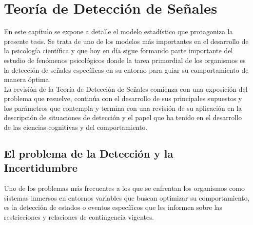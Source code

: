 
\chapter{Teoría de Detección de Señales} %

\label{Cap_SDT} %


\newcommand{\keyword}[1]{\textbf{#1}}
\newcommand{\tabhead}[1]{\textbf{#1}}
\newcommand{\code}[1]{\texttt{#1}}
\newcommand{\file}[1]{\texttt{\bfseries#1}}
\newcommand{\option}[1]{\texttt{\itshape#1}}


En este capítulo se expone a detalle el modelo estadístico que protagoniza la presente tesis. Se trata de uno de los modelos más importantes en el desarrollo de la psicología científica y que hoy en día sigue formando parte importante del estudio de fenómenos psicológicos donde la tarea primordial de los organismos es la detección de señales específicas en su entorno para guiar su comportamiento de manera óptima.\\

La revisión de la Teoría de Detección de Señales comienza con una exposición del problema que resuelve, continúa con el desarrollo de sus principales supuestos y los parámetros que contempla y termina con una revisión de su aplicación en la descripción de situaciones de detección y el papel que ha tenido en el desarrollo de las ciencias cognitivas y del comportamiento.\\

\section{El problema de la Detección y la Incertidumbre}

Uno de los problemas más frecuentes a los que se enfrentan los organismos como sistemas inmersos en entornos variables que buscan optimizar su comportamiento, es la detección de estados o eventos específicos que les informen sobre las restricciones y relaciones de contingencia vigentes.\\

